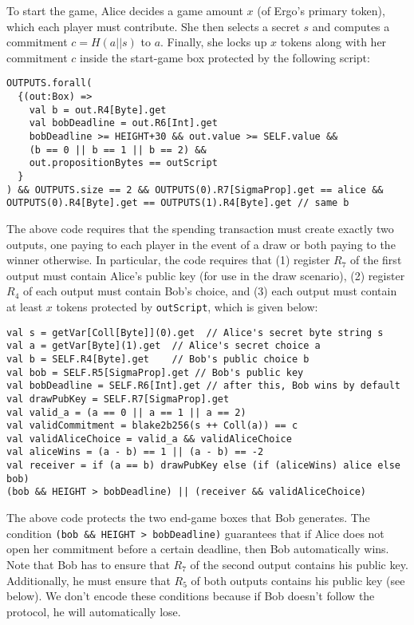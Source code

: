 \documentclass[runningheads]{llncs}
\begin{document}
To start the game, Alice decides a game amount $x$ (of Ergo's primary token), which each player must contribute. She then selects a secret $s$ and computes a commitment $c=H(a||s)$ to $a$. Finally, she locks up $x$ tokens along with her commitment $c$ inside the start-game box protected by the following script:
\small{
	\begin{verbatim}
OUTPUTS.forall(
  {(out:Box) =>
    val b = out.R4[Byte].get
    val bobDeadline = out.R6[Int].get
    bobDeadline >= HEIGHT+30 && out.value >= SELF.value &&
    (b == 0 || b == 1 || b == 2) && 
    out.propositionBytes == outScript
  }
) && OUTPUTS.size == 2 && OUTPUTS(0).R7[SigmaProp].get == alice &&
OUTPUTS(0).R4[Byte].get == OUTPUTS(1).R4[Byte].get // same b
	\end{verbatim}
}


The above code requires that the spending transaction must create exactly two outputs, one paying to each player in the event of a draw or both paying to the winner otherwise. In particular, the code requires that (1) register $R_7$ of the first output must contain Alice's public key (for use in the draw scenario), (2) register $R_4$ of each output must contain Bob's choice, and (3) each output must contain at least $x$ tokens protected by \texttt{outScript}, which is given below:

\small{
\begin{verbatim}
val s = getVar[Coll[Byte]](0).get  // Alice's secret byte string s
val a = getVar[Byte](1).get  // Alice's secret choice a
val b = SELF.R4[Byte].get    // Bob's public choice b
val bob = SELF.R5[SigmaProp].get // Bob's public key
val bobDeadline = SELF.R6[Int].get // after this, Bob wins by default
val drawPubKey = SELF.R7[SigmaProp].get
val valid_a = (a == 0 || a == 1 || a == 2) 
val validCommitment = blake2b256(s ++ Coll(a)) == c   
val validAliceChoice = valid_a && validAliceChoice
val aliceWins = (a - b) == 1 || (a - b) == -2
val receiver = if (a == b) drawPubKey else (if (aliceWins) alice else bob)
(bob && HEIGHT > bobDeadline) || (receiver && validAliceChoice)
\end{verbatim}
}


The above code protects the two end-game boxes that Bob generates. The condition \texttt{(bob \&\& HEIGHT > bobDeadline)} guarantees that if Alice does not open her commitment before a certain deadline, then Bob automatically wins. 
Note that Bob has to ensure that $R_7$ of the second output contains his public key. Additionally, he must ensure that $R_5$ of both outputs contains his public key (see below). We don't encode these conditions because if Bob doesn't follow the protocol, he will automatically lose.
\end{document}
